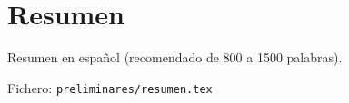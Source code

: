 %

\chapter{Resumen}

Resumen en español (recomendado de 800 a 1500 palabras).

Fichero: \texttt{preliminares/resumen.tex}


\endinput
